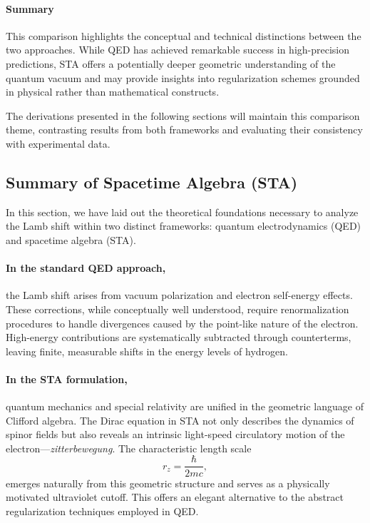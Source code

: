 \documentclass[12pt]{article}
\begin{document}
\paragraph{Summary}
This comparison highlights the conceptual and technical distinctions between the two approaches. While QED has achieved remarkable success in high-precision predictions, STA offers a potentially deeper geometric understanding of the quantum vacuum and may provide insights into regularization schemes grounded in physical rather than mathematical constructs.

The derivations presented in the following sections will maintain this comparison theme, contrasting results from both frameworks and evaluating their consistency with experimental data.


\subsection{Summary of Spacetime Algebra (STA)}\label{subsec:sta_summary}

In this section, we have laid out the theoretical foundations necessary to analyze the Lamb shift within two distinct frameworks: quantum electrodynamics (QED) and spacetime algebra (STA). 

\paragraph{In the standard QED approach,} the Lamb shift arises from vacuum polarization and electron self-energy effects. These corrections, while conceptually well understood, require renormalization procedures to handle divergences caused by the point-like nature of the electron. High-energy contributions are systematically subtracted through counterterms, leaving finite, measurable shifts in the energy levels of hydrogen.

\paragraph{In the STA formulation,} quantum mechanics and special relativity are unified in the geometric language of Clifford algebra. The Dirac equation in STA not only describes the dynamics of spinor fields but also reveals an intrinsic light-speed circulatory motion of the electron—\emph{zitterbewegung}. The characteristic length scale
\[
r_z = \frac{\hbar}{2mc},
\]
emerges naturally from this geometric structure and serves as a physically motivated ultraviolet cutoff. This offers an elegant alternative to the abstract regularization techniques employed in QED.
\end{document}
